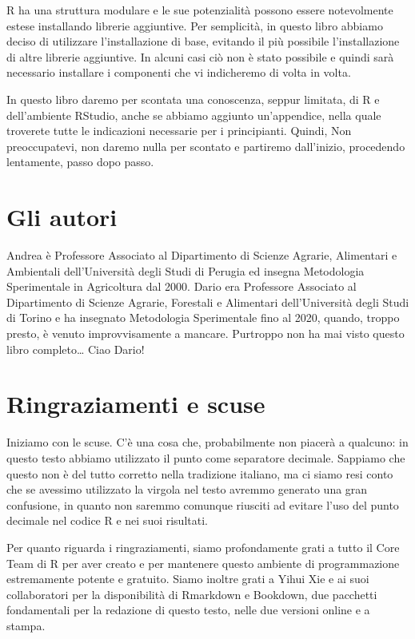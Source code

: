 \documentclass[a4paper,12pt,oneside]{book}
\begin{document}
R ha una struttura modulare e le sue potenzialità possono essere notevolmente estese installando librerie aggiuntive. Per semplicità, in questo libro abbiamo deciso di utilizzare l'installazione di base, evitando il più possibile l'installazione di altre librerie aggiuntive. In alcuni casi ciò non è stato possibile e quindi sarà necessario installare i componenti che vi indicheremo di volta in volta.

In questo libro daremo per scontata una conoscenza, seppur limitata, di R e dell'ambiente RStudio, anche se abbiamo aggiunto un'appendice, nella quale troverete tutte le indicazioni necessarie per i principianti. Quindi, Non preoccupatevi, non daremo nulla per scontato e partiremo dall'inizio, procedendo lentamente, passo dopo passo.

\hypertarget{gli-autori}{%
\section*{Gli autori}\label{gli-autori}}

Andrea è Professore Associato al Dipartimento di Scienze Agrarie, Alimentari e Ambientali dell'Università degli Studi di Perugia ed insegna Metodologia Sperimentale in Agricoltura dal 2000. Dario era Professore Associato al Dipartimento di Scienze Agrarie, Forestali e Alimentari dell'Università degli Studi di Torino e ha insegnato Metodologia Sperimentale fino al 2020, quando, troppo presto, è venuto improvvisamente a mancare. Purtroppo non ha mai visto questo libro completo\ldots{} Ciao Dario!

\hypertarget{ringraziamenti-e-scuse}{%
\section*{Ringraziamenti e scuse}\label{ringraziamenti-e-scuse}}

Iniziamo con le scuse. C'è una cosa che, probabilmente non piacerà a qualcuno: in questo testo abbiamo utilizzato il punto come separatore decimale. Sappiamo che questo non è del tutto corretto nella tradizione italiano, ma ci siamo resi conto che se avessimo utilizzato la virgola nel testo avremmo generato una gran confusione, in quanto non saremmo comunque riusciti ad evitare l'uso del punto decimale nel codice R e nei suoi risultati.

Per quanto riguarda i ringraziamenti, siamo profondamente grati a tutto il Core Team di R per aver creato e per mantenere questo ambiente di programmazione estremamente potente e gratuito. Siamo inoltre grati a Yihui Xie e ai suoi collaboratori per la disponibilità di Rmarkdown e Bookdown, due pacchetti fondamentali per la redazione di questo testo, nelle due versioni online e a stampa.
\end{document}
